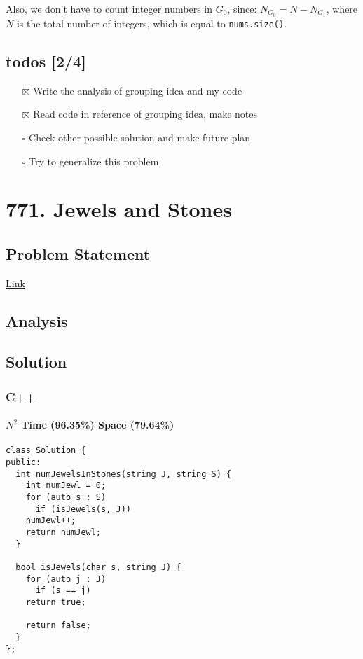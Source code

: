 \documentclass[12pt]{book}
\begin{document}
Also, we don't have to count integer numbers in \(G_0\), since: \(N_{G_0} = N - N_{G_1}\), where \(N\) is the total number of integers, which is equal to \texttt{nums.size()}.

\section{todos [2/4]}
\label{sec:orgb42f6fc}
\begin{itemize}
\item[{$\boxtimes$}] Write the analysis of grouping idea and my code
\item[{$\boxtimes$}] Read code in reference of grouping idea, make notes
\item[{$\square$}] Check other possible solution and make future plan
\item[{$\square$}] Try to generalize this problem
\end{itemize}
\chapter{771. Jewels and Stones}
\label{sec:org5ce9ca0}
\section{Problem Statement}
\label{sec:org437772c}
\href{https://leetcode.com/problems/jewels-and-stones/}{Link}
\section{Analysis}
\label{sec:org9097aa0}
\section{Solution}
\label{sec:orge02b07c}
\subsection{C++}
\label{sec:orga84e856}
\subsubsection{\(N^2\) Time (96.35\%) Space (79.64\%)}
\label{sec:org2820079}
\begin{verbatim}
class Solution {
public:
  int numJewelsInStones(string J, string S) {
    int numJewl = 0;
    for (auto s : S)
      if (isJewels(s, J))
	numJewl++;
    return numJewl;
  }

  bool isJewels(char s, string J) {
    for (auto j : J)
      if (s == j)
	return true;

    return false;
  }
};
\end{verbatim}
\end{document}
